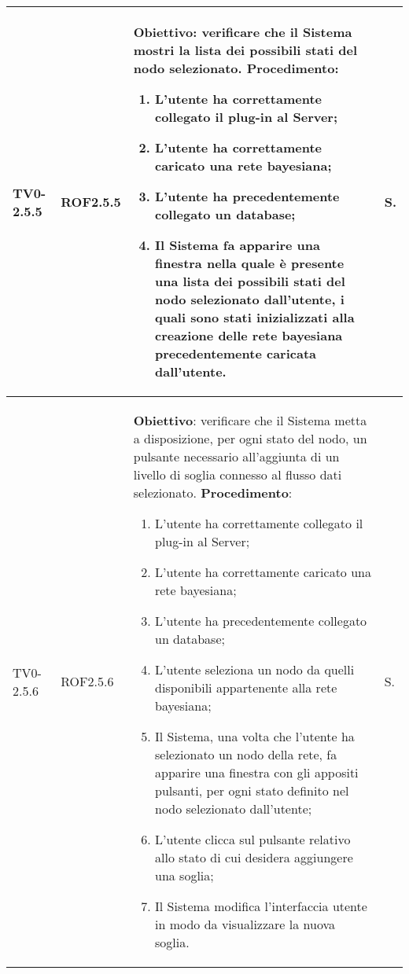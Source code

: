 \begin{longtable}{|C{.15\textwidth}|C{.13\textwidth}|m{.65\textwidth}|C{.08\textwidth}|}
TV0-2.5.5 & ROF2.5.5 &
	\textbf{Obiettivo}: verificare che il Sistema mostri la lista dei possibili stati del nodo selezionato. \newline
	\textbf{Procedimento}:
	\begin{enumerate}
		\item L'utente ha correttamente collegato il plug-in al Server;
		\item L'utente ha correttamente caricato una rete bayesiana;
		\item L'utente ha precedentemente collegato un database;
		\item Il Sistema fa apparire una finestra nella quale è presente   una lista dei possibili stati del nodo selezionato dall'utente, i quali sono stati inizializzati alla creazione delle rete bayesiana precedentemente caricata dall'utente.
	\end{enumerate}
	& S. \\
\hline

TV0-2.5.6 & ROF2.5.6 &
	\textbf{Obiettivo}: verificare che il Sistema metta a disposizione, per ogni stato del nodo, un pulsante necessario all'aggiunta di un livello di soglia connesso al flusso dati selezionato. \newline
	\textbf{Procedimento}:
	\begin{enumerate}
		\item L'utente ha correttamente collegato il plug-in al Server;
		\item L'utente ha correttamente caricato una rete bayesiana;
		\item L'utente ha precedentemente collegato un database;
		\item L'utente seleziona un nodo da quelli disponibili appartenente alla rete bayesiana;
		\item Il Sistema, una volta che l'utente ha selezionato un nodo della rete, fa apparire una finestra con gli appositi pulsanti, per ogni stato definito nel nodo selezionato dall'utente;
		\item L'utente clicca sul pulsante relativo allo stato di cui desidera aggiungere una soglia;
		\item Il Sistema modifica l'interfaccia utente in modo da visualizzare la nuova soglia.
	\end{enumerate}
	& S. \\
\hline


\end{longtable}
